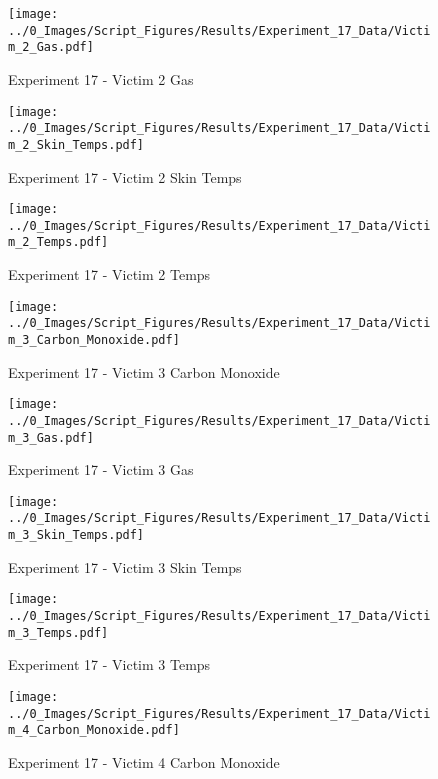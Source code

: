 	\clearpage

	\begin{figure}[H]
		\centering
		\texttt{[image: ../0\_Images/Script\_Figures/Results/Experiment\_17\_Data/Victim\_2\_Gas.pdf]}
		\caption[]{Experiment 17 - Victim 2 Gas}
	\end{figure}
 

	\begin{figure}[H]
		\centering
		\texttt{[image: ../0\_Images/Script\_Figures/Results/Experiment\_17\_Data/Victim\_2\_Skin\_Temps.pdf]}
		\caption[]{Experiment 17 - Victim 2 Skin Temps}
	\end{figure}
 
	\clearpage

	\begin{figure}[H]
		\centering
		\texttt{[image: ../0\_Images/Script\_Figures/Results/Experiment\_17\_Data/Victim\_2\_Temps.pdf]}
		\caption[]{Experiment 17 - Victim 2 Temps}
	\end{figure}
 

	\begin{figure}[H]
		\centering
		\texttt{[image: ../0\_Images/Script\_Figures/Results/Experiment\_17\_Data/Victim\_3\_Carbon\_Monoxide.pdf]}
		\caption[]{Experiment 17 - Victim 3 Carbon Monoxide}
	\end{figure}
 
	\clearpage

	\begin{figure}[H]
		\centering
		\texttt{[image: ../0\_Images/Script\_Figures/Results/Experiment\_17\_Data/Victim\_3\_Gas.pdf]}
		\caption[]{Experiment 17 - Victim 3 Gas}
	\end{figure}
 

	\begin{figure}[H]
		\centering
		\texttt{[image: ../0\_Images/Script\_Figures/Results/Experiment\_17\_Data/Victim\_3\_Skin\_Temps.pdf]}
		\caption[]{Experiment 17 - Victim 3 Skin Temps}
	\end{figure}
 
	\clearpage

	\begin{figure}[H]
		\centering
		\texttt{[image: ../0\_Images/Script\_Figures/Results/Experiment\_17\_Data/Victim\_3\_Temps.pdf]}
		\caption[]{Experiment 17 - Victim 3 Temps}
	\end{figure}
 

	\begin{figure}[H]
		\centering
		\texttt{[image: ../0\_Images/Script\_Figures/Results/Experiment\_17\_Data/Victim\_4\_Carbon\_Monoxide.pdf]}
		\caption[]{Experiment 17 - Victim 4 Carbon Monoxide}
	\end{figure}
 
